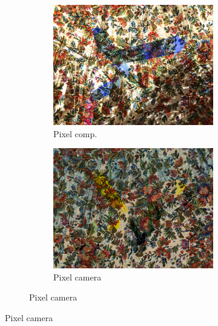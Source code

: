 \begin{figure}[]
\begin{subfigure}{\textwidth}
\begin{subfigure}{0.24\textwidth}
            \includegraphics[width=\textwidth]{images/04-experiment02/photo/flowers/pixel_im.jpg}
            \caption*{Pixel comp.}
        \end{subfigure}
        \hfill
        \begin{subfigure}{0.24\textwidth}
            \centering
            \includegraphics[width=\textwidth]{images/04-experiment02/photo/flowers/pixel_proj.jpg}
            \caption*{Pixel camera}
        \end{subfigure}
    \end{subfigure}


\end{figure}
